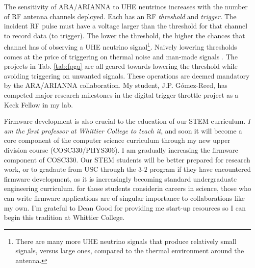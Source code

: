 \documentclass[../../main.tex]{subfiles}
\begin{document}
The sensitivity of ARA/ARIANNA to UHE neutrinos increases with the number of RF antenna channels deployed.  Each has an RF \textit{threshold} and \textit{trigger}.  The incident RF pulse must have a voltage larger than the threshold for that channel to record data (to trigger).  The lower the threshold, the higher the chances that channel has of observing a UHE neutrino signal\footnote{There are many more UHE neutrino signals that produce relatively small signals, versus large ones, compared to the thermal environment around the antenna.}.  Naively lowering thresholds comes at the price of triggering on thermal noise and man-made signals \cite{ALLISON201847} \cite{barwick2016radio}.  The projects in Tab. \ref{tab:fpga} are all geared towards lowering the threshold while avoiding triggering on unwanted signals.  These operations are deemed mandatory by the ARA/ARIANNA collaboration.  My student, J.P. G\'{o}mez-Reed, has competed major research milestones in the digital trigger throttle project as a Keck Fellow in my lab. \\ \hspace{0.1cm}

Firmware development is also crucial to the education of our STEM curriculum.  \textit{I am the first professor at Whittier College to teach it}, and soon it will become a core component of the computer science curriculum through my new upper division course (COSC330/PHYS306).  I am gradually increasing the firmware component of COSC330.  Our STEM students will be better prepared for research work, or to gradaute from USC through the 3-2 program if they have encountered firmware development, as it is increasingly becoming standard undergraduate engineering curriculum.  for those students considerin careers in science, those who can write firmware applications are of singular importance to collaborations like my own.  I'm grateful to Dean Good for providing me start-up resources so I can begin this tradition at Whittier College.
\end{document}
